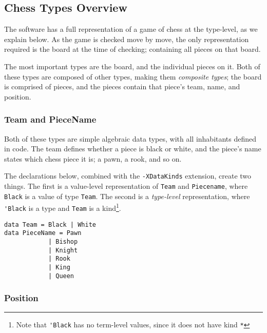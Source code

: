 \documentclass[12pt, a4paper]{scrartcl}
\begin{document}
\subsection{Chess Types Overview}

The software has a full representation of a game of chess at the type-level, as we explain below. As the game is checked move by move, the only representation required is the board at the time of checking; containing all pieces on that board.

The most important types are the board, and the individual pieces on it. Both of these types are composed of other types, making them \emph{composite types}; the board is comprised of pieces, and the pieces contain that piece's team, name, and position.

\subsubsection{Team and PieceName}

Both of these types are simple algebraic data types, with all inhabitants defined in code. The team defines whether a piece is black or white, and the piece's name states which chess piece it is; a pawn, a rook, and so on.

The declarations below, combined with the \lstinline{-XDataKinds} extension, create two things. The first is a value-level representation of \lstinline{Team} and \lstinline{Piecename}, where \lstinline{Black} is a value of type \lstinline{Team}. The second is a \emph{type-level} representation, where \lstinline{'Black} is a type and \lstinline{Team} is a kind\footnote{Note that \lstinline{'Black} has no term-level values, since it does not have kind \lstinline{*}}.


\begin{lstlisting}
data Team = Black | White
data PieceName = Pawn
            | Bishop
            | Knight
            | Rook
            | King
            | Queen
\end{lstlisting}

\subsubsection{Position}
\end{document}
